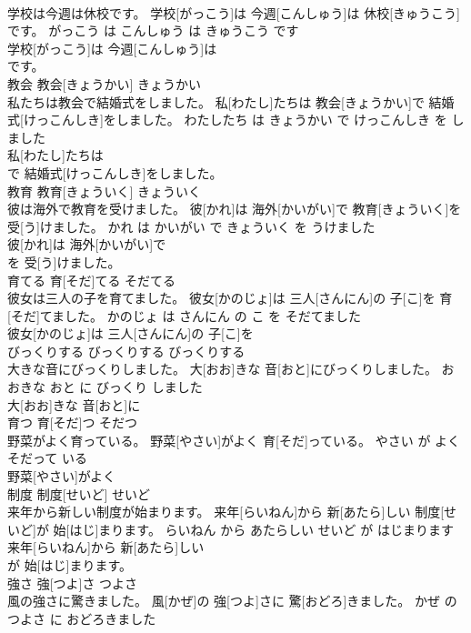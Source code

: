 \documentclass[8pt]{extreport}
\begin{document}
\begin{CJK}{UTF8}{min}
\\	学校は今週は休校です。	学校[がっこう]は 今週[こんしゅう]は 休校[きゅうこう]です。	がっこう は こんしゅう は きゅうこう です	
\\	学校[がっこう]は 今週[こんしゅう]は
\\	です。			
\\	教会	教会[きょうかい]	きょうかい	
\\	私たちは教会で結婚式をしました。	私[わたし]たちは 教会[きょうかい]で 結婚式[けっこんしき]をしました。	わたしたち は きょうかい で けっこんしき を しました	
\\	私[わたし]たちは
\\	で 結婚式[けっこんしき]をしました。			
\\	教育	教育[きょういく]	きょういく	
\\	彼は海外で教育を受けました。	彼[かれ]は 海外[かいがい]で 教育[きょういく]を 受[う]けました。	かれ は かいがい で きょういく を うけました	
\\	彼[かれ]は 海外[かいがい]で
\\	を 受[う]けました。			
\\	育てる	育[そだ]てる	そだてる	
\\	彼女は三人の子を育てました。	彼女[かのじょ]は 三人[さんにん]の 子[こ]を 育[そだ]てました。	かのじょ は さんにん の こ を そだてました	
\\	彼女[かのじょ]は 三人[さんにん]の 子[こ]を
\\	びっくりする	びっくりする	びっくりする	
\\	大きな音にびっくりしました。	大[おお]きな 音[おと]にびっくりしました。	おおきな おと に びっくり しました	
\\	大[おお]きな 音[おと]に
\\	育つ	育[そだ]つ	そだつ	
\\	野菜がよく育っている。	野菜[やさい]がよく 育[そだ]っている。	やさい が よく そだって いる	
\\	野菜[やさい]がよく
\\	制度	制度[せいど]	せいど	
\\	来年から新しい制度が始まります。	来年[らいねん]から 新[あたら]しい 制度[せいど]が 始[はじ]まります。	らいねん から あたらしい せいど が はじまります	
\\	来年[らいねん]から 新[あたら]しい
\\	が 始[はじ]まります。			
\\	強さ	強[つよ]さ	つよさ	
\\	風の強さに驚きました。	風[かぜ]の 強[つよ]さに 驚[おどろ]きました。	かぜ の つよさ に おどろきました	

\end{CJK}
\end{document}
